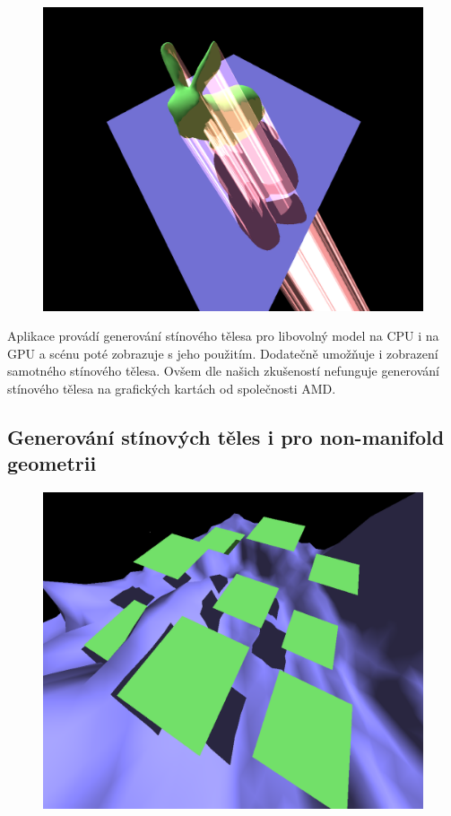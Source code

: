 \documentclass[11pt,a4paper]{article}
\begin{document}
\begin{figure}[h]
	\captionsetup{type=figure}
	\includegraphics[width=\textwidth]{images/bunny-volume.png}
\end{figure}

Aplikace provádí generování stínového tělesa pro libovolný model na CPU i na GPU a scénu poté zobrazuje s jeho použitím. Dodatečně umožňuje i zobrazení samotného stínového tělesa. Ovšem dle našich zkušeností nefunguje generování stínového tělesa na grafických kartách od společnosti AMD.

\subsection{Generování stínových těles i pro non-manifold geometrii}

\begin{figure}[h]
	\captionsetup{type=figure}
	\includegraphics[width=\textwidth]{images/multiple-raised-planes.png}
	\label{fig:multiple-raised-planes}
\end{figure}
\end{document}

